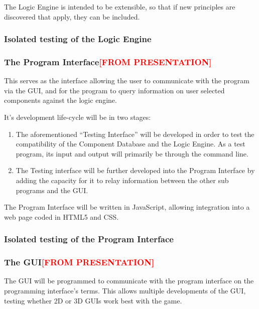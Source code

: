 The Logic Engine is intended to be extensible, so that if new principles are discovered that apply, they can be included.

\subsubsection{Isolated testing of the Logic Engine}

\subsubsection{The Program Interface\textcolor{red}{[FROM PRESENTATION]}}
\label{sec:Methodology:TechnicalOverview:TheProgramInterface}
This serves as the interface allowing the user to communicate with 
the program via the GUI, and for the program to query information on 
user selected components
against the logic engine.

It's development life-cycle will be in two stages:

\begin{enumerate}

\item The aforementioned “Testing Interface” will be developed in order to test the compatibility 
of the Component Database and the Logic Engine. As a test program, its input and output 
will primarily be through the command line.

\item The Testing interface will be further developed into the Program Interface by adding the
capacity for it to relay information between the other sub programs and the GUI.

\end{enumerate} 

The Program Interface will be written in JavaScript, allowing integration into a web page coded in HTML5 and CSS.

\subsubsection{Isolated testing of the Program Interface}

\subsubsection{The GUI\textcolor{red}{[FROM PRESENTATION]}}
\label{sec:Methodology:TechnicalOverview:TheGUI}
The GUI will be programmed to communicate with the program interface on the programming interface's terms. This allows multiple developments of the GUI, testing whether 2D or 3D GUIs work best with the game.

